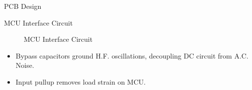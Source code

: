 



\begin{frame}{PCB Design}
	\begin{figure}
		\centering


	\end{figure}
\end{frame}



\begin{frame}{MCU Interface Circuit}
	\begin{figure}
		\centering


		\caption{MCU Interface Circuit}
	\end{figure}

	\begin{itemize}
		\item Bypass capacitors ground H.F. oscillations, decoupling DC circuit from A.C. Noise.
		\item Input pullup removes load strain on MCU.
	\end{itemize}
\end{frame}


